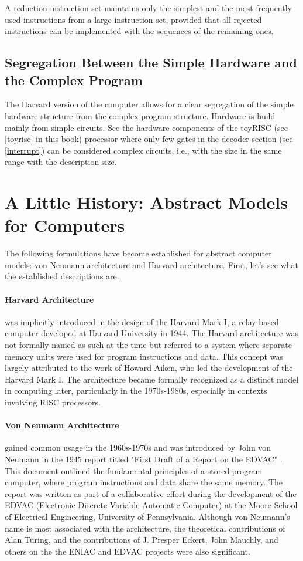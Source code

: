 A reduction instruction set maintains only the simplest and  the most frequently used instructions from a large instruction set, provided that all rejected instructions can be implemented with the sequences of the remaining ones.

\subsection{Segregation Between the Simple Hardware and the Complex Program}

The Harvard version of the computer allows for a clear segregation of the simple hardware structure from the complex program structure. Hardware is build mainly from simple circuits. See the hardware components of the toyRISC (see \ref{toyrisc} in this book) processor where only few gates in the decoder section (see \ref{interrupt}) can be considered complex circuits, i.e., with the size in the same range with the description size.


\section{A Little History: Abstract Models for Computers}

The following formulations have become established for abstract computer models: von Neumann architecture and Harvard architecture. First, let's see what the established descriptions are.

\paragraph{Harvard Architecture} was implicitly introduced in the design of the Harvard Mark I, a relay-based computer developed at Harvard University in 1944. The Harvard architecture was not formally named as such at the time but referred to a system where separate memory units were used for program instructions and data. This concept was largely attributed to the work of Howard Aiken, who led the development of the Harvard Mark I. The architecture became formally recognized as a distinct model in computing later, particularly in the 1970s-1980s, especially in contexts involving RISC processors.

\paragraph{Von Neumann Architecture} gained common usage in the 1960s-1970s and was introduced by John von Neumann in the 1945 report titled "First Draft of a Report on the EDVAC" \cite{vonNeumann1945} \cite{vonNeumann45}. This document outlined the fundamental principles of a stored-program computer, where program instructions and data share the same memory. The report was written as part of a collaborative effort during the development of the EDVAC (Electronic Discrete Variable Automatic Computer) at the Moore School of Electrical Engineering, University of Pennsylvania. Although von Neumann's name is most associated with the architecture, the theoretical contributions of Alan Turing, and the contributions of J. Presper Eckert, John Mauchly, and others on the the ENIAC and EDVAC projects were also significant.

